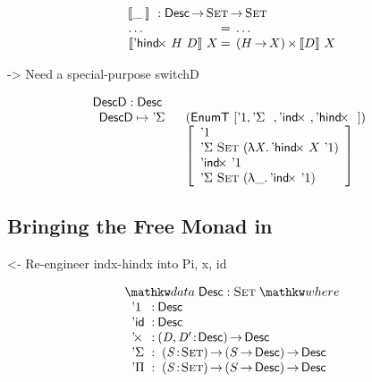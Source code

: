 \documentclass[preprint, authoryear]{sigplanconf}
\newenvironment{structure}{\footnotesize\verbatim}{\endverbatim}
\begin{document}
\[\stk{
\:\:\descop{\_\:}{} : \Desc \To \Set \To \Set \\
\begin{array}{l@{\:=\:\:}ll}
\ldots                        &  \ldots \\
\descop{\DHindx{H}{D}}{X}     &  \TIMES{(H \To X)}{\descop{D}{X}}
\end{array}
}\]

\begin{structure}
    -> Need a special-purpose switchD
\end{structure}


\[\stk{
\DescD : \Desc \\
\begin{array}{ll}
\DescD \mapsto \DSigma{}{} & (\EnumT [ \DUnit, \DSigma{}{}, \DIndx{}, \DHindx{}{} ]) \\
                           & \left[\begin{array}{l}
                                   \DUnit                                \\
                                   \DSigma{\Set}{(\LAM{\V{X}} \DHindx{X}{\DUnit})} \\
                                   \DIndx{\DUnit}                                  \\
                                   \DSigma{\Set}{(\LAM{\_} \DIndx{\DUnit})}
                                   \end{array}
                             \right]
\end{array}
}
\]

\subsection{Bringing the Free Monad in}

\begin{structure}
<- Re-engineer indx-hindx into Pi, x, id
\end{structure}

\[
\stk{
\data \Desc : \Set \where \\
\;\;\begin{array}{@{}l@{\::\:}l@{\quad}l}
    \DUnit          & \Desc                                   \\
    \DId            & \Desc                                   \\
    \DProd{}{}      & \PI{\V{D}, \V{D'}}{\Desc} \Desc         \\
    \DSigma         & \PI{\V{S}}{\Set} \PIS{S \To \Desc} \Desc \\
    \DPi            & \PI{\V{S}}{\Set} \PIS{S \To \Desc} \Desc 
\end{array}
}
\]
\end{document}
